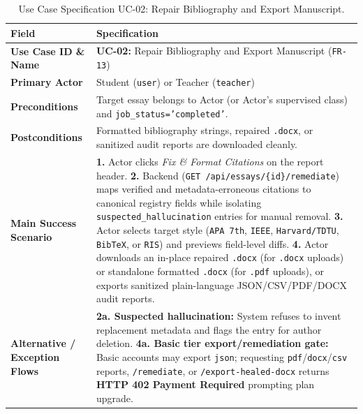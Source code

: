 \begin{table}[!htbp]
\centering
\caption{Use Case Specification UC-02: Repair Bibliography and Export Manuscript.}\label{tab:uc02}
\begin{tabular}{|L{0.24}|L{0.76}|}
\hline
\textbf{Field} & \textbf{Specification} \\
\hline
\textbf{Use Case ID \& Name} & \textbf{UC-02:} Repair Bibliography and Export Manuscript (\texttt{FR-13}) \\
\hline
\textbf{Primary Actor} & Student (\texttt{user}) or Teacher (\texttt{teacher}) \\
\hline
\textbf{Preconditions} & Target essay belongs to Actor (or Actor's supervised class) and \texttt{job\_status='completed'}. \\
\hline
\textbf{Postconditions} & Formatted bibliography strings, repaired \texttt{.docx}, or sanitized audit reports are downloaded cleanly. \\
\hline
\textbf{Main Success Scenario} & \textbf{1.} Actor clicks \textit{Fix \& Format Citations} on the report header. \newline \textbf{2.} Backend (\texttt{GET /api/essays/\{id\}/remediate}) maps verified and metadata-erroneous citations to canonical registry fields while isolating \texttt{suspected\_hallucination} entries for manual removal. \newline \textbf{3.} Actor selects target style (\texttt{APA 7th}, \texttt{IEEE}, \texttt{Harvard/TDTU}, \texttt{BibTeX}, or \texttt{RIS}) and previews field-level diffs. \newline \textbf{4.} Actor downloads an in-place repaired \texttt{.docx} (for \texttt{.docx} uploads) or standalone formatted \texttt{.docx} (for \texttt{.pdf} uploads), or exports sanitized plain-language JSON/CSV/PDF/DOCX audit reports. \\
\hline
\textbf{Alternative / Exception Flows} & \textbf{2a. Suspected hallucination:} System refuses to invent replacement metadata and flags the entry for author deletion. \newline \textbf{4a. Basic tier export/remediation gate:} Basic accounts may export \texttt{json}; requesting \texttt{pdf}/\texttt{docx}/\texttt{csv} reports, \texttt{/remediate}, or \texttt{/export-healed-docx} returns \textbf{HTTP 402 Payment Required} prompting plan upgrade. \\
\hline
\end{tabular}
\end{table}

